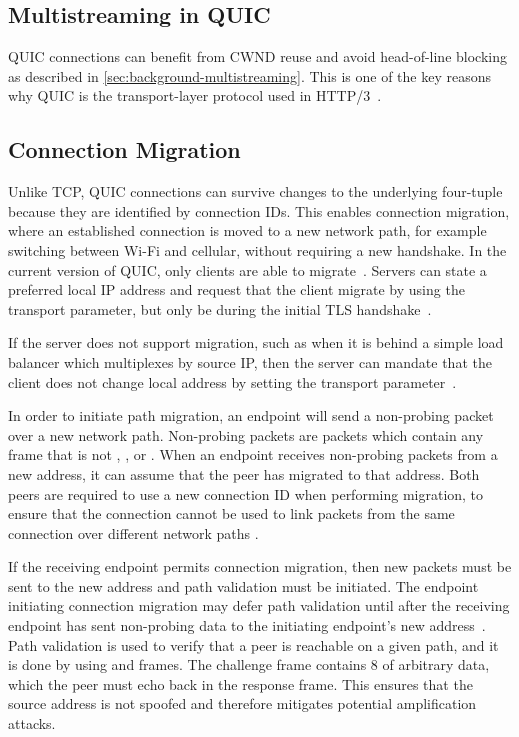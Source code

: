 \subsection{Multistreaming in QUIC}
QUIC connections can benefit from
CWND reuse and avoid head-of-line blocking as described
in \cref{sec:background-multistreaming}. This is one of the key
reasons why QUIC is the transport-layer protocol used in HTTP/3~\cite{rfc9114}.

\subsection{Connection Migration}\label{sec:connection-migration}
Unlike TCP, QUIC connections can survive changes to the underlying four-tuple
because they are identified by connection IDs. This enables connection
migration, where an established connection is moved to a new network path,
for example switching between Wi-Fi and cellular, without requiring a new handshake.
In the current version of QUIC, only clients are able to migrate~\cite[sec.~1]{rfc9000}.
Servers can state a preferred local IP address and request that the client
migrate by using the  transport parameter,
but only be during the initial TLS handshake~\cite[sec.~9.6.1]{rfc9000}.

If the server does not support migration, such as when it is behind a simple load balancer which multiplexes
by source IP, then the server can mandate
that the client does not change local address by setting the 
transport parameter~\cite[sec.~5.2.3]{rfc9000}.

In order to initiate path migration, an endpoint will send a non-probing packet 
over a new network path. Non-probing packets are packets which contain any
frame that is not , ,  or
. When an endpoint receives non-probing packets from a new address, it can assume 
that the peer has migrated to that address. Both peers are required to use a new connection
ID when performing migration, to ensure that the connection cannot
be used to link packets from the same connection over different network paths
\cite[sec.~9.5]{rfc9000}.

If the receiving endpoint permits connection migration,
then new packets must be sent to the new address
and path validation must be initiated.
The endpoint initiating connection migration may defer path validation until after
the receiving endpoint has sent non-probing data to the initiating endpoint's new
address~\cite[sec.~9.2]{rfc9000}.
Path validation is used to verify
that a peer is reachable on a given path, and it is done by using  and  
frames. The challenge frame contains \qty{8}{\Bytes} of arbitrary data,
which the peer must echo back in the response frame. This ensures that the source address
is not spoofed and therefore mitigates potential amplification attacks.

